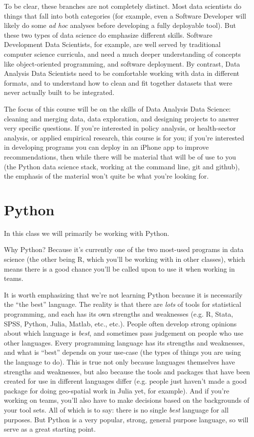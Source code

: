 \documentclass[12pt]{article}
\begin{document}
To be clear, these branches are not completely distinct. Most data scientists do things that fall into both categories (for example, even a Software Developer will likely do some \emph{ad hoc} analyses before developing a fully deployable tool). But these two types of data science do emphasize different skills. Software Development Data Scientists, for example, are well served by traditional computer science curricula, and need a much deeper understanding of concepts like object-oriented programming, and software deployment. By contrast, Data Analysis Data Scientists need to be comfortable working with data in different formats, and to understand how to clean and fit together datasets that were never actually built to be integrated.

The focus of this course will be on the skills of Data Analysis Data Science: cleaning and merging data, data exploration, and designing projects to answer very specific questions. If you're interested in policy analysis, or health-sector analysis, or applied empirical research, this course is for you; if you're interested in developing programs you can deploy in an iPhone app to improve recommendations, then while there will be material that will be of use to you (the Python data science stack, working at the command line, git and github), the emphasis of the material won't quite be what you're looking for.

\section{Python}

In this class we will primarily be working with Python.

Why Python? Because it's currently one of the two most-used programs in data science (the other being R, which you'll be working with in other classes), which means there is a good chance you'll be called upon to use it when working in teams.

It is worth emphasizing that we're not learning Python because it is necessarily the ``the best'' language. The reality is that there are \emph{lots} of tools for statistical programming, and each has its own strengths and weaknesses (e.g. R, Stata, SPSS, Python, Julia, Matlab, etc., etc.). People often develop strong opinions about which language is \emph{best}, and sometimes pass judgement on people who use other languages. Every programming language has its strengths and weaknesses, and what is ``best'' depends on your use-case (the types of things you are using the language to do). This is true not only because languages themselves have strengths and weaknesses, but also because the tools and packages that have been created for use in different languages differ (e.g. people just haven't made a good package for doing geo-spatial work in Julia yet, for example). And if you're working on teams, you'll also have to make decisions based on the backgrounds of your tool sets. All of which is to say: there is no single \emph{best} language for all purposes. But Python is a very popular, strong, general purpose language, so will serve as a great starting point.
\end{document}
